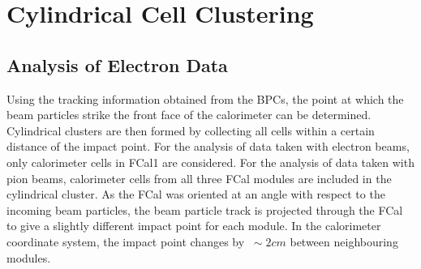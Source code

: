 \section{Cylindrical Cell Clustering}

\subsection{Analysis of Electron Data}

%
%
%










%
%

Using the tracking information obtained from the BPCs, the point at which the beam particles strike the front face of the calorimeter can be determined. Cylindrical clusters are then formed by collecting all cells within a certain distance of the impact point. For the analysis of data taken with electron beams, only calorimeter cells in FCal1 are considered. For the analysis of data taken with pion beams, calorimeter cells from all three FCal modules are included in the cylindrical cluster. As the FCal was oriented at an angle with respect to the incoming beam particles, the beam particle track is projected through the FCal to give a slightly different impact point for each module. In the calorimeter coordinate system, the impact point changes by $~\sim 2cm$ between neighbouring modules.

%
%
%
%

